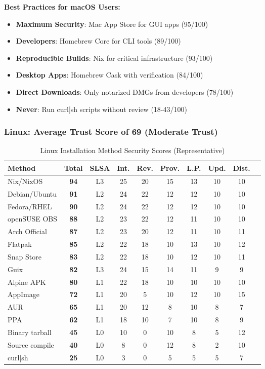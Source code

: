 \documentclass[11pt,a4paper]{article}
\begin{document}
\textbf{Best Practices for macOS Users:}
\begin{itemize}
    \item \textbf{Maximum Security}: Mac App Store for GUI apps (95/100)
    \item \textbf{Developers}: Homebrew Core for CLI tools (89/100)
    \item \textbf{Reproducible Builds}: Nix for critical infrastructure (93/100)
    \item \textbf{Desktop Apps}: Homebrew Cask with verification (84/100)
    \item \textbf{Direct Downloads}: Only notarized DMGs from developers (78/100)
    \item \textbf{Never}: Run curl|sh scripts without review (18-43/100)
\end{itemize}

\subsubsection{Linux: Average Trust Score of 69 (Moderate Trust)}

\begin{table}[h]
\centering
\caption{Linux Installation Method Security Scores (Representative)}
\begin{tabular}{lccccccccc}
\toprule
\textbf{Method} & \textbf{Total} & \textbf{SLSA} & \textbf{Int.} & \textbf{Rev.} & \textbf{Prov.} & \textbf{L.P.} & \textbf{Upd.} & \textbf{Dist.} \\
\midrule
Nix/NixOS & \textbf{94} & L3 & 25 & 20 & 15 & 13 & 10 & 10 \\
Debian/Ubuntu & \textbf{91} & L2 & 24 & 22 & 12 & 12 & 10 & 10 \\
Fedora/RHEL & \textbf{90} & L2 & 24 & 22 & 12 & 12 & 10 & 10 \\
openSUSE OBS & \textbf{88} & L2 & 23 & 22 & 12 & 11 & 10 & 10 \\
Arch Official & \textbf{87} & L2 & 23 & 20 & 12 & 11 & 10 & 11 \\
Flatpak & \textbf{85} & L2 & 22 & 18 & 10 & 13 & 10 & 12 \\
Snap Store & \textbf{83} & L2 & 22 & 18 & 10 & 12 & 10 & 11 \\
Guix & \textbf{82} & L3 & 24 & 15 & 14 & 11 & 9 & 9 \\
Alpine APK & \textbf{80} & L1 & 22 & 18 & 10 & 10 & 10 & 10 \\
AppImage & \textbf{72} & L1 & 20 & 5 & 10 & 12 & 10 & 15 \\
AUR & \textbf{65} & L1 & 20 & 12 & 8 & 10 & 8 & 7 \\
PPA & \textbf{62} & L1 & 18 & 10 & 7 & 10 & 8 & 9 \\
Binary tarball & \textbf{45} & L0 & 10 & 0 & 10 & 8 & 5 & 12 \\
Source compile & \textbf{40} & L0 & 8 & 0 & 12 & 8 & 2 & 10 \\
curl|sh & \textbf{25} & L0 & 3 & 0 & 5 & 5 & 5 & 7 \\
\bottomrule
\end{tabular}
\end{table}
\end{document}
